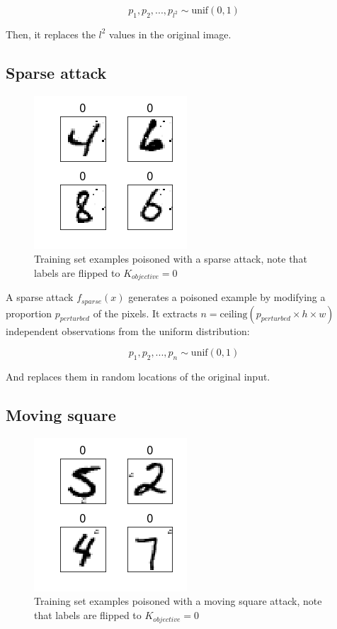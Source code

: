 \documentclass[letterpaper, 10 pt, conference]{ieeeconf}  %
\begin{document}
$$p_1, p_2,...,p_{l^2}\sim \text{unif}(0, 1)$$

Then, it replaces the $l^2$ values in the original image.


\subsection{Sparse attack}

\begin{figure}[h]
\caption{Training set examples poisoned with a sparse attack, note that labels are flipped to $K_{objective}=0$}
\centering
\includegraphics{sparse.png}
\end{figure}

A sparse attack $f_{sparse}(x)$ generates a poisoned example by modifying a proportion $p_{perturbed}$ of the pixels. It extracts $n = \text{ceiling}(p_{perturbed} \times h \times w)$ independent observations from the uniform distribution:

$$p_1, p_2,...,p_{n}\sim \text{unif}(0, 1)$$

And replaces them in random locations of the original input.

\subsection{Moving square}

\begin{figure}[h]
\caption{Training set examples poisoned with a moving square attack, note that labels are flipped to $K_{objective}=0$}
\centering
\includegraphics{moving-square.png}
\end{figure}
\end{document}
